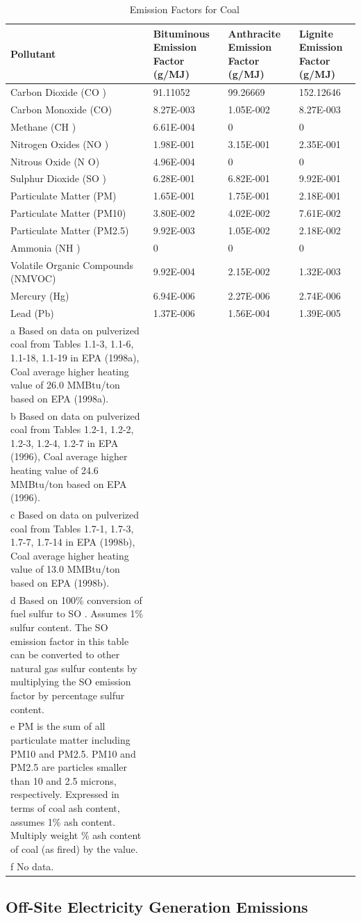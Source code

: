 \begin{longtable}[c]{p{1.5in}p{1.5in}p{1.5in}p{1.5in}}
\caption{  Emission Factors for Coal \protect \label{table:emission-factors-for-coal}}\\
\toprule 
Pollutant & Bituminous Emission Factor   (g/MJ) & Anthracite Emission Factor   (g/MJ) & Lignite Emission Factor   (g/MJ) \tabularnewline \midrule
\endhead
Carbon Dioxide (CO  ) & 91.11052 & 99.26669 & 152.12646 \tabularnewline
Carbon Monoxide (CO) & 8.27E-003 & 1.05E-002 & 8.27E-003 \tabularnewline
Methane (CH  ) & 6.61E-004 & 0 & 0 \tabularnewline
Nitrogen Oxides (NO  ) & 1.98E-001 & 3.15E-001 & 2.35E-001 \tabularnewline
Nitrous Oxide (N  O) & 4.96E-004 & 0 & 0 \tabularnewline
Sulphur Dioxide (SO  ) & 6.28E-001 & 6.82E-001 & 9.92E-001 \tabularnewline
Particulate Matter (PM) & 1.65E-001 & 1.75E-001 & 2.18E-001 \tabularnewline
Particulate Matter (PM10) & 3.80E-002 & 4.02E-002 & 7.61E-002 \tabularnewline
Particulate Matter (PM2.5) & 9.92E-003 & 1.05E-002 & 2.18E-002 \tabularnewline
Ammonia (NH  ) & 0 & 0 & 0 \tabularnewline
Volatile Organic Compounds (NMVOC) & 9.92E-004 & 2.15E-002 & 1.32E-003 \tabularnewline
Mercury (Hg) & 6.94E-006 & 2.27E-006 & 2.74E-006 \tabularnewline
Lead (Pb) & 1.37E-006 & 1.56E-004 & 1.39E-005 \tabularnewline
a Based on data on pulverized coal from Tables 1.1-3, 1.1-6, 1.1-18, 1.1-19 in EPA (1998a), Coal average higher heating value of 26.0 MMBtu/ton based on EPA (1998a). \tabularnewline
b Based on data on pulverized coal from Tables 1.2-1, 1.2-2, 1.2-3, 1.2-4, 1.2-7 in EPA (1996), Coal average higher heating value of 24.6 MMBtu/ton based on EPA (1996). \tabularnewline
c Based on data on pulverized coal from Tables 1.7-1, 1.7-3, 1.7-7, 1.7-14 in EPA (1998b), Coal average higher heating value of 13.0 MMBtu/ton based on EPA (1998b). \tabularnewline
d Based on 100\% conversion of fuel sulfur to SO  . Assumes 1\% sulfur content. The SO   emission factor in this table can be converted to other natural gas sulfur contents by multiplying the SO   emission factor by percentage sulfur content. \tabularnewline
e PM is the sum of all particulate matter including PM10 and PM2.5. PM10 and PM2.5 are particles smaller than 10 and 2.5 microns, respectively. Expressed in terms of coal ash content, assumes 1\% ash content. Multiply weight \% ash content of coal (as fired) by the value. \tabularnewline
f No data. \tabularnewline
\bottomrule
\end{longtable}

\subsection{Off-Site Electricity Generation Emissions}\label{off-site-electricity-generation-emissions}

